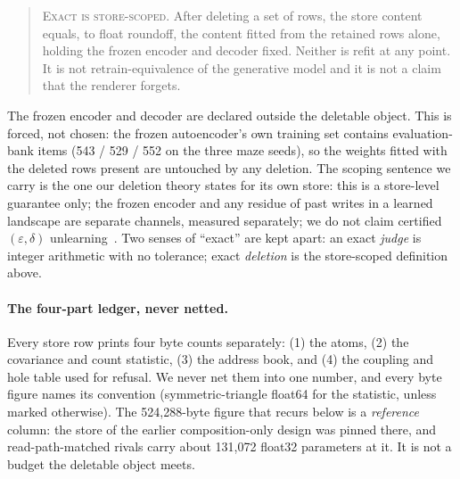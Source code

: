 \documentclass{article} %
\begin{document}
\begin{quote}\small
\textsc{Exact is store-scoped.} After deleting a set of rows, the store content equals, to
float roundoff, the content fitted from the retained rows alone, holding the frozen encoder and
decoder fixed. Neither is refit at any point. It is not retrain-equivalence of the generative
model and it is not a claim that the renderer forgets.
\end{quote}

\noindent The frozen encoder and decoder are declared outside the deletable object. This is
forced, not chosen: the frozen autoencoder's own training set contains evaluation-bank items
(543 / 529 / 552 on the three maze seeds), so the weights fitted with the deleted rows present
are untouched by any deletion. %
The scoping sentence we carry is the one our deletion theory states for its own store: this is
a store-level guarantee only; the frozen encoder and any residue of past writes in a learned
landscape are separate channels, measured separately; we do not claim certified
$(\varepsilon,\delta)$ unlearning~\citep{guo2020certified}. %
Two senses of ``exact'' are kept apart: an exact \emph{judge} is integer arithmetic with no
tolerance; exact \emph{deletion} is the store-scoped definition above.

\paragraph{The four-part ledger, never netted.} Every store row prints four byte counts
separately: (1) the atoms, (2) the covariance and count statistic, (3) the address book, and
(4) the coupling and hole table used for refusal. We never net them into one number, and every
byte figure names its convention (symmetric-triangle float64 for the statistic, unless marked
otherwise). The 524,288-byte figure that recurs below is a \emph{reference} column: the store
of the earlier composition-only design was pinned there, and read-path-matched rivals carry
about 131,072 float32 parameters at it. %
It is not a budget the deletable object meets.
\end{document}
